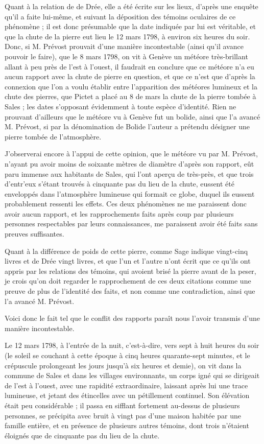 \documentclass[a4paper, 12pt, oneside, french]{article}
\begin{document}
Quant à la relation de de Drée, elle a été écrite sur les lieux, d'après une enquête qu'il a faite lui-même, et suivant la déposition des témoins oculaires de ce phénomène ; il est donc présumable que la date indiquée par lui est véritable, et que la chute de la pierre eut lieu le 12 mars 1798, à environ six heures du soir. Donc, si M. Prévost prouvait d'une manière incontestable (ainsi qu'il avance pouvoir le faire), que le 8 mars 1798, on vit à Genève un météore très-brillant allant à peu près de l'est à l'ouest, il faudrait en conclure que ce météore n'a eu aucun rapport avec la chute de pierre en question, et que ce n'est que d'après la connexion que l'on a voulu établir entre l'apparition des météores lumineux et la chute des pierres, que Pictet a placé au 8 de mars la chute de la pierre tombée à Sales ; les dates s'opposant évidemment à toute espèce d'identité. Rien ne prouvant d'ailleurs que le météore vu à Genève fut un bolide, ainsi que l'a avancé M. Prévost, si par la dénomination de Bolide l'auteur a prétendu désigner une pierre tombée de l'atmosphère.

J'observerai encore à l'appui de cette opinion, que le météore vu par M. Prévost, n'ayant pu avoir moins de soixante mètres de diamètre d'après son rapport, eût paru immense aux habitants de Sales, qui l'ont aperçu de très-près, et que trois d'entr'eux s'étant trouvés à cinquante pas du lieu de la chute, eussent été enveloppés dans l'atmosphère lumineuse qui formait ce globe, duquel ils eussent probablement ressenti les effets. Ces deux phénomènes ne me paraissent donc avoir aucun rapport, et les rapprochements faits après coup par plusieurs personnes respectables par leurs connaissances, me paraissent avoir été faits sans preuves suffisantes.

Quant à la différence de poids de cette pierre, comme Sage indique vingt-cinq livres et de Drée vingt livres, et que l'un et l'autre n'ont écrit que ce qu'ils ont appris par les relations des témoins, qui avoient brisé la pierre avant de la peser, je crois qu'on doit regarder le rapprochement de ces deux citations comme une preuve de plus de l'identité des faits, et non comme une contradiction, ainsi que l'a avancé M. Prévost.

Voici donc le fait tel que le conflit des rapports paraît nous l'avoir transmis d'une manière incontestable.

Le 12 mars 1798, à l'entrée de la nuit, c'est-à-dire, vers sept à huit heures du soir (le soleil se couchant à cette époque à cinq heures quarante-sept minutes, et le crépuscule prolongeant les jours jusqu'à six heures et demie), on vit dans la commune de Sales et dans les villages environnants, un corps igné qui se dirigeait de l'est à l'ouest, avec une rapidité extraordinaire, laissant après lui une trace lumineuse, et jetant des étincelles avec un pétillement continuel. Son élévation était peu considérable ; il passa en sifflant fortement au-dessus de plusieurs personnes, se précipita avec bruit à vingt pas d'une maison habitée par une famille entière, et en présence de plusieurs autres témoins, dont trois n'étaient éloignés que de cinquante pas du lieu de la chute.
\end{document}
